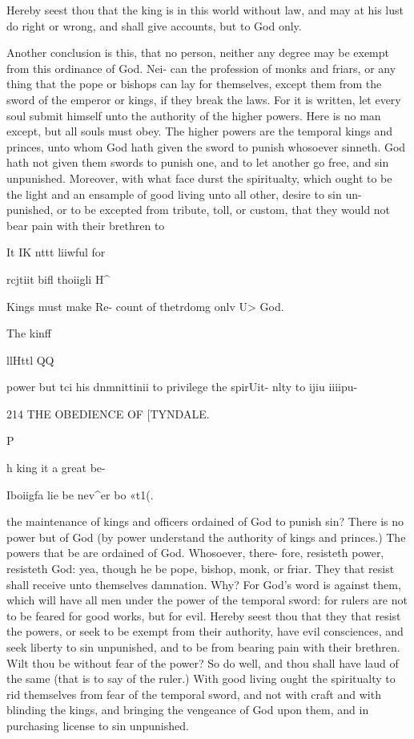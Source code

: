 \documentclass{custom}
\begin{document}
Hereby seest thou that the king is in this world without 
law, and may at his lust do right or wrong, and shall give 
accounts, but to God only. 

Another conclusion is this, that no person, neither any 
degree may be exempt from this ordinance of God. Nei- 
can the profession of monks and friars, or any thing that 
the pope or bishops can lay for themselves, except them
from the sword of the emperor or kings, if they break 
the laws. For it is written, let every soul submit himself 
unto the authority of the higher powers. Here is no man 
except, but all souls must obey. The higher powers are 
the temporal kings and princes, unto whom God hath 
given the sword to punish whosoever sinneth. God hath 
not given them swords to punish one, and to let another 
go free, and sin unpunished. Moreover, with what face 
durst the spiritualty, which ought to be the light and an 
ensample of good living unto all other, desire to sin un- 
punished, or to be excepted from tribute, toll, or custom, 
that they would not bear pain with their brethren to 

It IK nttt 
liiwful for 

rcjtiit bifl 
thoiigli H^ 

Kings must 
make Re- 
count of 
thetrdomg 
onlv U> 
God. 

The kinff 

llHttl QQ 

power but 
tci his 
dnmnittinii 
to privilege 
the spirUit- 
nlty to ijiu 
iiiipu- 


214
THE OBEDIENCE OF
[TYNDALE.

P 

h king it a 
great be- 

Iboiigfa lie 
be nev^er bo 
«t1(. 

the maintenance of kings and officers ordained of God to 
punish sin? There is no power but of God (by power 
understand the authority of kings and princes.) The 
powers that be are ordained of God. Whosoever, there- 
fore, resisteth power, resisteth God: yea, though he be 
pope, bishop, monk, or friar. They that resist shall 
receive unto themselves damnation. Why? For God's 
word is against them, which will have all men under the 
power of the temporal sword: for rulers are not to 
be feared for good works, but for evil. Hereby seest 
thou that they that resist the powers, or seek to be exempt 
from their authority, have evil consciences, and seek liberty 
to sin unpunished, and to be from bearing pain with 
their brethren. Wilt thou be without fear of the power?
So do well, and thou shall have laud of the same (that is 
to say of the ruler.) With good living ought the spiritualty 
to rid themselves from fear of the temporal sword, and 
not with craft and with blinding the kings, and bringing the 
vengeance of God upon them, and in purchasing license 
to sin unpunished. 
\end{document}
